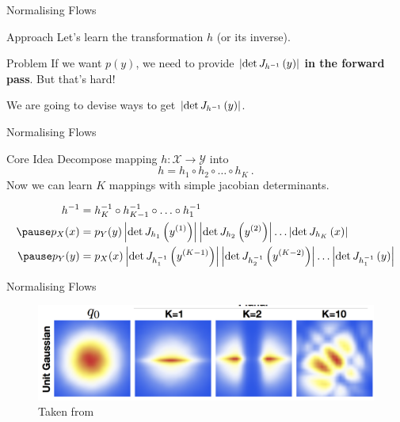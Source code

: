 \documentclass[14pt]{beamer}
\begin{document}
\begin{frame}{Normalising Flows}
\begin{block}{Approach}
Let's learn the transformation $ h $ (or its inverse).
\end{block}
\pause
\begin{block}{Problem}
If we want $ p(y) $, we need to provide $ \left|\det J_{h^{-1}}\left(y\right)\right| $ \textbf{in the forward pass}. But that's hard!
\end{block}
We are going to devise ways to get $ \left|\det J_{h^{-1}}\left(y\right)\right| $.
\end{frame}

\begin{frame}{Normalising Flows}
\begin{block}{Core Idea}
Decompose mapping $ h: \mathcal{X} \rightarrow \mathcal{Y} $ into 
\begin{equation*}
h = h_{1}\circ h_{2}\circ\ldots\circ h_K \ .
\end{equation*}
\pause
Now we can learn $ K $ mappings with simple jacobian determinants.
\begin{small}
\pause
\begin{equation*}
\begin{aligned}
h^{-1} &= h_{K}^{-1}\circ h_{K-1}^{-1} \circ \ldots \circ h_{1}^{-1} \\ \pause
p_{X}(x) &= p_{Y}(y) \djac{h_{1}}{y^{(1)}}\djac{h_{2}}{y^{(2)}}\ldots \djac{h_{K}}{x} \\ \pause
p_{Y}(y) &= p_{X}(x)\djac{h_{1}^{-1}}{y^{(K-1)}} \djac{h_{2}^{-1}}{y^{(K-2)}}\ldots \djac{h_{1}^{-1}}{y}
\end{aligned}
\end{equation*}
\end{small}
\end{block}
\end{frame}

\begin{frame}{Normalising Flows}
\begin{figure}
\includegraphics[scale=.4]{nf.png}
\caption{Taken from \cite{RezendeMohamed:2015}}
\end{figure}
\end{frame}
\end{document}
